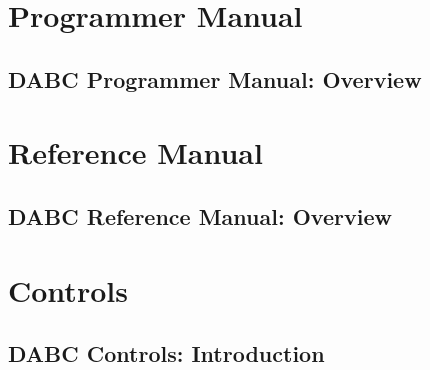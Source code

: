 \documentclass{dabcclass}
\begin{document}
\part{Programmer Manual}
\chapter{DABC Programmer Manual: Overview}
 \cleardoublepage
\part{Reference Manual}
\chapter{DABC Reference Manual: Overview}
 \cleardoublepage
\part{Controls}
\chapter{DABC Controls: Introduction}
 \cleardoublepage

\thispagestyle{empty}
 \cleardoublepage

\end{document}
